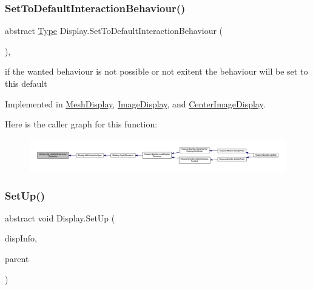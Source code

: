 \subsubsection{\texorpdfstring{Set\+To\+Default\+Interaction\+Behaviour()}{SetToDefaultInteractionBehaviour()}}
{\footnotesize\ttfamily abstract \mbox{\hyperlink{class_display_a2c80ba13fff1fd81aaa6915b28e8c14f}{Type}} Display.\+Set\+To\+Default\+Interaction\+Behaviour (\begin{DoxyParamCaption}{ }\end{DoxyParamCaption})\hspace{0.3cm}{\ttfamily [protected]}, {}}



if the wanted behaviour is not possible or not exitent the behaviour will be set to this default 



Implemented in \mbox{\hyperlink{class_mesh_display_a8cd58e07cb9d64598c3bbc6701515d1d}{Mesh\+Display}}, \mbox{\hyperlink{class_image_display_ae975595939d76dd1db32e6f029f53ab6}{Image\+Display}}, and \mbox{\hyperlink{class_center_image_display_ac6ddf9c8df99ff76c0f508ba4e45a217}{Center\+Image\+Display}}.

Here is the caller graph for this function\+:
\nopagebreak
\begin{figure}[H]
\begin{center}
\leavevmode
\includegraphics[width=350pt]{class_display_a81f07350cf50b3924f4fe269e1b4cf17_icgraph}
\end{center}
\end{figure}
\mbox{\label{class_display_a57325251fbeac943cd48520e50f0bec4}} 
\subsubsection{\texorpdfstring{Set\+Up()}{SetUp()}}
{\footnotesize\ttfamily abstract void Display.\+Set\+Up (\begin{DoxyParamCaption}\item[{\mbox{\hyperlink{class_museum_display_info}{Museum\+Display\+Info}}}]{disp\+Info,  }\item[{Game\+Object}]{parent }\end{DoxyParamCaption})\hspace{0.3cm}{\ttfamily [pure virtual]}}



